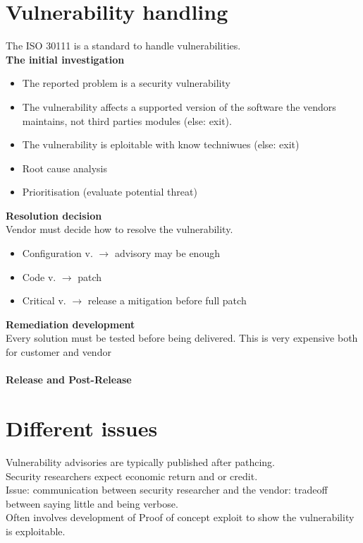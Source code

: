 \documentclass[10pt,a4paper]{book}
\begin{document}
\section{Vulnerability handling}
The ISO 30111 is a standard to handle vulnerabilities.\\
\textbf{The initial investigation}
\begin{itemize}
\item The reported problem is a security vulnerability
\item The vulnerability affects a supported version of the software the vendors maintains, not third parties modules (else: exit).
\item The vulnerability is eploitable with know techniwues (else: exit)
\item Root cause analysis
\item Prioritisation (evaluate potential threat)
\end{itemize}
\textbf{Resolution decision}\\
Vendor must decide how to resolve the vulnerability.
\begin{itemize}
\item Configuration v. $\to$ advisory may be enough
\item Code v. $\to$ patch
\item Critical v. $\to$ release a mitigation before full patch
\end{itemize}
\textbf{Remediation development}\\
Every solution must be tested before being delivered. This is very expensive both for customer and vendor\\\\
\textbf{Release and Post-Release}\\
\section{Different issues}
Vulnerability advisories are typically published after pathcing.\\
Security researchers expect economic return and or credit.\\
Issue: communication between security researcher and the vendor: tradeoff between saying little and being verbose.\\
Often involves development of Proof of concept exploit to show the vulnerability is exploitable.
\end{document}
